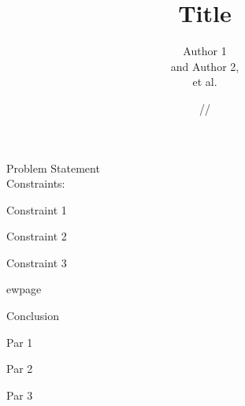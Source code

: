 \documentclass[11pt]{report}
\title{\textbf{Title}}
\author{Author 1\\and Author 2,\\et al.}
\date{\oldstylenums{00}/\oldstylenums{00}/\oldstylenums{00}}
\begin{document}
\maketitle
 
\begin{outline}
	\item Problem Statement \\ Constraints:
    \begin{outline}
    	\item Constraint 1
    	\item Constraint 2
    	\item Constraint 3

	\end{outline}
\end{outline}


ewpage

Conclusion
\par Par 1
\par Par 2
\par Par 3
\end{document}
